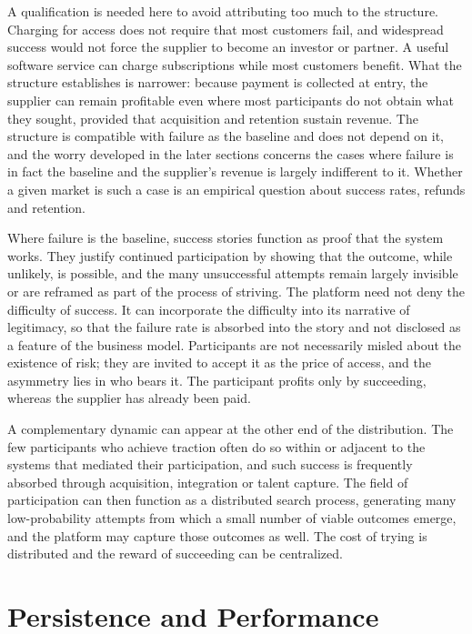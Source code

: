 \documentclass[12pt, a4paper]{article}
\begin{document}
A qualification is needed here to avoid attributing too much to the structure. Charging for access does not require that most customers fail, and widespread success would not force the supplier to become an investor or partner. A useful software service can charge subscriptions while most customers benefit. What the structure establishes is narrower: because payment is collected at entry, the supplier can remain profitable even where most participants do not obtain what they sought, provided that acquisition and retention sustain revenue. The structure is compatible with failure as the baseline and does not depend on it, and the worry developed in the later sections concerns the cases where failure is in fact the baseline and the supplier's revenue is largely indifferent to it. Whether a given market is such a case is an empirical question about success rates, refunds and retention.

Where failure is the baseline, success stories function as proof that the system works. They justify continued participation by showing that the outcome, while unlikely, is possible, and the many unsuccessful attempts remain largely invisible or are reframed as part of the process of striving. The platform need not deny the difficulty of success. It can incorporate the difficulty into its narrative of legitimacy, so that the failure rate is absorbed into the story and not disclosed as a feature of the business model. Participants are not necessarily misled about the existence of risk; they are invited to accept it as the price of access, and the asymmetry lies in who bears it. The participant profits only by succeeding, whereas the supplier has already been paid.

A complementary dynamic can appear at the other end of the distribution. The few participants who achieve traction often do so within or adjacent to the systems that mediated their participation, and such success is frequently absorbed through acquisition, integration or talent capture. The field of participation can then function as a distributed search process, generating many low-probability attempts from which a small number of viable outcomes emerge, and the platform may capture those outcomes as well. The cost of trying is distributed and the reward of succeeding can be centralized.

\section{Persistence and Performance}
\end{document}
